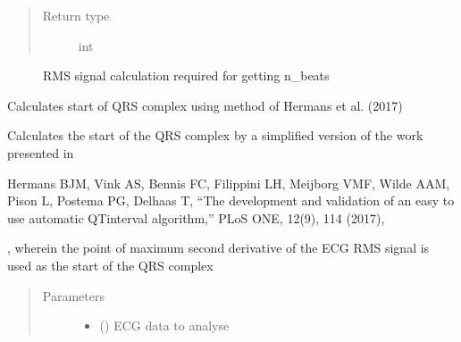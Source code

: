 \documentclass[letterpaper,10pt,english]{sphinxmanual}
\begin{document}
\begin{fulllineitems}
\begin{fulllineitems}
\begin{quote}
\begin{description}
\item[{Return type}] \leavevmode
\sphinxAtStartPar
int

\end{description}\end{quote}


\nopagebreak

\begin{description}
\item[{{\hyperref[\detokenize{_autosummary/signalanalysis.general.Signal:id1}]{}}}] \leavevmode
\sphinxAtStartPar
RMS signal calculation required for getting n\_beats

\end{description}



\end{fulllineitems}


\begin{fulllineitems}
\label{\detokenize{_autosummary/signalanalysis.ecg.Ecg:id1}}
\sphinxAtStartPar
Calculates start of QRS complex using method of Hermans et al. (2017)

\sphinxAtStartPar
Calculates the start of the QRS complex by a simplified version of the work presented in \sphinxstepexplicit %
\begin{footnote}[1]\label{\thesphinxscope.1}%
\sphinxAtStartFootnote
Hermans BJM, Vink AS, Bennis FC, Filippini LH, Meijborg VMF, Wilde AAM, Pison L, Postema PG, Delhaas T,
“The development and validation of an easy to use automatic QT\sphinxhyphen{}interval algorithm,”
PLoS ONE, 12(9), 1\textendash{}14 (2017), 
%
\end{footnote}, wherein the
point of maximum second derivative of the ECG RMS signal is used as the start of the QRS complex
\begin{quote}\begin{description}
\item[{Parameters}] \leavevmode\begin{itemize}
\item {} 
\sphinxAtStartPar
{} ({\hyperref[\detokenize{_autosummary/signalanalysis.ecg.Ecg:signalanalysis.ecg.Ecg}]{}}) \textendash{} ECG data to analyse


\end{itemize}
\end{description}
\end{quote}
\end{fulllineitems}
\end{fulllineitems}
\end{document}
